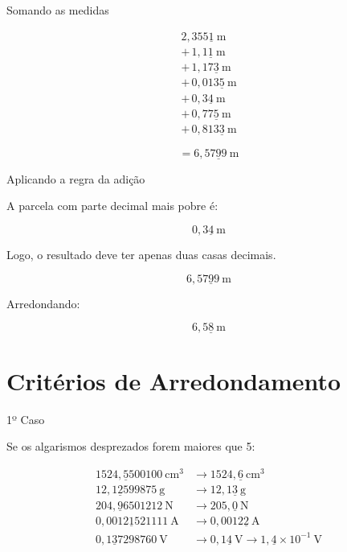 \documentclass[aspectratio=169,10pt]{beamer}
\begin{document}
\begin{frame}{Somando as medidas}

\begin{align*}
2,355\underline{1}\ \text{m} \\
+\,1,1\underline{1}\ \text{m} \\
+\,1,17\underline{3}\ \text{m} \\
+\,0,013\underline{5}\ \text{m} \\
+\,0,3\underline{4}\ \text{m} \\
+\,0,77\underline{5}\ \text{m} \\
+\,0,813\underline{3}\ \text{m}
\end{align*}

\[
= 6,57\underline{9}9\ \text{m}
\]

\end{frame}


\begin{frame}{Aplicando a regra da adição}

A parcela com parte decimal mais pobre é:

\[
0,3\underline{4}\ \text{m}
\]

Logo, o resultado deve ter apenas duas casas decimais.

\[
6,57\underline{9}9\ \text{m}
\]

Arredondando:

\[
6,5\underline{8}\ \text{m}
\]

\end{frame}

\section{Critérios de Arredondamento}

\begin{frame}{1º Caso}

Se os algarismos desprezados forem maiores que 5:

\begin{align*}
1524,\underline{5}500100\ \text{cm}^3 &\rightarrow 1524,\underline{6}\ \text{cm}^3 \\
12,1\underline{2}599875\ \text{g} &\rightarrow 12,1\underline{3}\ \text{g} \\
204,\underline{9}6501212\ \text{N} &\rightarrow 205,\underline{0}\ \text{N} \\
0,0012\underline{1}521111\ \text{A} &\rightarrow 0,0012\underline{2}\ \text{A} \\
0,1\underline{3}7298760\ \text{V} &\rightarrow 0,1\underline{4}\ \text{V} \rightarrow 1,\underline{4}\times 10^{-1}\ \text{V}
\end{align*}

\end{frame}
\end{document}

